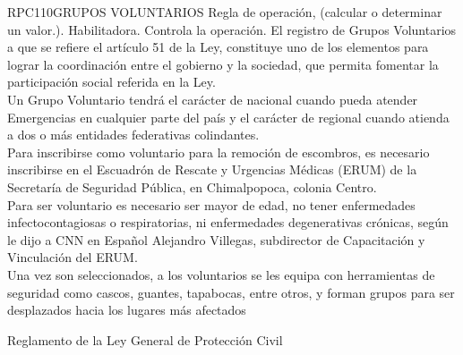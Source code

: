 \begin{BusinessRule}{RPC110}{GRUPOS VOLUNTARIOS}{
		Regla de operación, (calcular o determinar un valor.).
	}{
		Habilitadora. 
	}{
		Controla la operación. %
	}
	\BRItem[Descripción:]  El registro de Grupos Voluntarios a que se refiere el artículo 51 de la Ley, constituye uno de los elementos para lograr la coordinación entre el gobierno y la sociedad, que permita fomentar la participación social referida en la Ley.\\Un Grupo Voluntario tendrá el carácter de nacional cuando pueda atender Emergencias en cualquier parte del país y el carácter de regional cuando atienda a dos o más entidades federativas colindantes.\\Para inscribirse como voluntario para la remoción de escombros, es necesario inscribirse en el Escuadrón de Rescate y Urgencias Médicas (ERUM) de la Secretaría de Seguridad Pública, en Chimalpopoca, colonia Centro.\\Para ser voluntario es necesario ser mayor de edad, no tener enfermedades infectocontagiosas o respiratorias, ni enfermedades degenerativas crónicas, según le dijo a CNN en Español Alejandro Villegas, subdirector de Capacitación y Vinculación del ERUM.\\

Una vez son seleccionados, a los voluntarios se les equipa con herramientas de seguridad como cascos, guantes, tapabocas, entre otros, y forman grupos para ser desplazados hacia los lugares más afectados
	
	
	 Reglamento de la Ley General de Protección Civil
\end{BusinessRule}